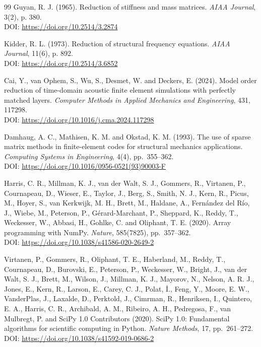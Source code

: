 \documentclass{jors}
\begin{document}
\begin{thebibliography}{99}
Guyan, R. J. (1965).
Reduction of stiffness and mass matrices.
\textit{AIAA Journal}, 3(2), p. 380.\\
DOI: \url{https://doi.org/10.2514/3.2874}

Kidder, R. L. (1973).
Reduction of structural frequency equations.
\textit{AIAA Journal}, 11(6), p. 892.\\
DOI: \url{https://doi.org/10.2514/3.6852}

Cai, Y., van Ophem, S., Wu, S., Desmet, W. and Deckers, E. (2024).
Model order reduction of time-domain acoustic finite element simulations with perfectly matched layers.
\textit{Computer Methods in Applied Mechanics and Engineering}, 431, 117298.\\
DOI: \url{https://doi.org/10.1016/j.cma.2024.117298}

Damhaug, A. C., Mathisen, K. M. and Okstad, K. M. (1993).
The use of sparse matrix methods in finite-element codes for structural mechanics applications.
\textit{Computing Systems in Engineering}, 4(4), pp.~355--362.\\
DOI: \url{https://doi.org/10.1016/0956-0521(93)90003-F}

Harris, C. R., Millman, K. J., van der Walt, S. J., Gommers, R., Virtanen, P.,
Cournapeau, D., Wieser, E., Taylor, J., Berg, S., Smith, N. J., Kern, R.,
Picus, M., Hoyer, S., van Kerkwijk, M. H., Brett, M., Haldane, A.,
Fern{\'a}ndez del R{\'i}o, J., Wiebe, M., Peterson, P., G{\'e}rard-Marchant, P.,
Sheppard, K., Reddy, T., Weckesser, W., Abbasi, H., Gohlke, C. and Oliphant, T. E. (2020).
Array programming with NumPy.
\textit{Nature}, 585(7825), pp.~357--362.\\
DOI: \url{https://doi.org/10.1038/s41586-020-2649-2}

Virtanen, P., Gommers, R., Oliphant, T. E., Haberland, M., Reddy, T.,
Cournapeau, D., Burovski, E., Peterson, P., Weckesser, W., Bright, J.,
van der Walt, S. J., Brett, M., Wilson, J., Millman, K. J., Mayorov, N.,
Nelson, A. R. J., Jones, E., Kern, R., Larson, E., Carey, C. J.,
Polat, {\.I}., Feng, Y., Moore, E. W., VanderPlas, J., Laxalde, D.,
Perktold, J., Cimrman, R., Henriksen, I., Quintero, E. A., Harris, C. R.,
Archibald, A. M., Ribeiro, A. H., Pedregosa, F., van Mulbregt, P. and
SciPy 1.0 Contributors (2020).
SciPy 1.0: Fundamental algorithms for scientific computing in Python.
\textit{Nature Methods}, 17, pp.~261--272.\\
DOI: \url{https://doi.org/10.1038/s41592-019-0686-2}


\end{thebibliography}
\end{document}
